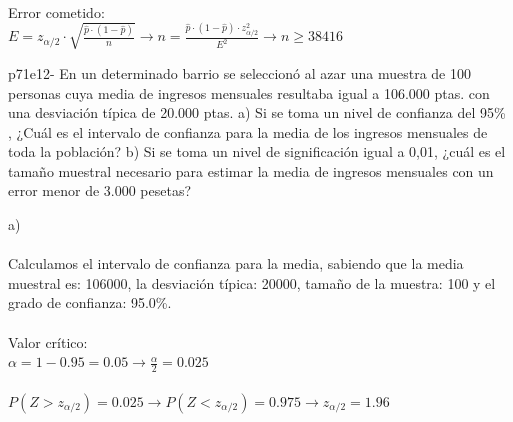 \documentclass[spanish, 11pt]{exam}
\begin{document}
\begin{questions}
\begin{solution}
     \\
    Error cometido: \\ $E=z_{\alpha / 2}\cdot \sqrt{\frac{\widehat{p}\cdot\left(1-\widehat{p} \right)}{n}} \to n =\frac{\widehat{p}\cdot\left(1-\widehat{p} \right)\cdot z_{\alpha / 2}^2}{E^2} \to n \geq38416$ \\    \end{solution}\question p71e12- En un determinado barrio se seleccionó al azar una muestra de 100 personas cuya media de ingresos
mensuales resultaba igual a 106.000 ptas. con una desviación típica de 20.000 ptas.
a) Si se toma un nivel de confianza del 95\% , ¿Cuál es el intervalo de confianza para la media de los
ingresos mensuales de toda la población?
b) Si se toma un nivel de significación igual a 0,01, ¿cuál es el tamaño muestral necesario para estimar
la media de ingresos mensuales con un error menor de 3.000 pesetas? \begin{solution}   a) \\  \\Calculamos el intervalo de confianza para la media, sabiendo que la media muestral es: 106000, la desviación típica: 20000, tamaño de la muestra: 100 y el grado de confianza: 95.0\%. \\ \\ Valor crítico: \\ $\alpha=1-0.95=0.05\to \frac{\alpha}{2}=0.025$ \\ \\ $P(Z>z_{\alpha/2})=0.025\to P(Z<z_{\alpha/2})=0.975 \to z_{\alpha/2} =1.96$ \\ 
\end{solution}
\end{questions}
\end{document}
